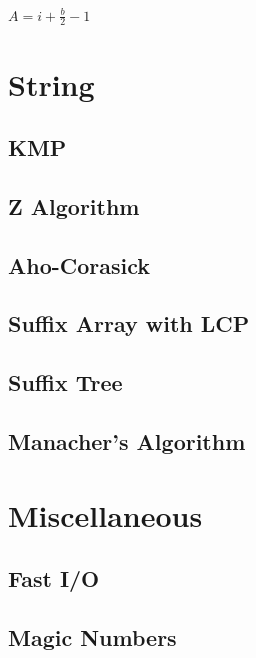 \documentclass[10pt,landscape,a4paper,twocolumn]{article}
\begin{document}
$A = i + \frac{b}{2} - 1$

\section{String}

\subsection{KMP}


\subsection{Z Algorithm}


\subsection{Aho-Corasick}


\subsection{Suffix Array with LCP}


\subsection{Suffix Tree}

\subsection{Manacher's Algorithm}



\section{Miscellaneous}

\subsection{Fast I/O}


\subsection{Magic Numbers}
\end{document}
